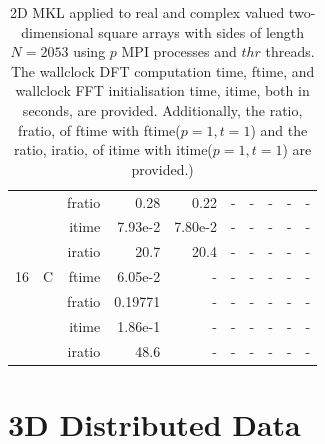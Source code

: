 \documentclass[a4paper]{article}
\begin{document}
\begin{table}[htbp]
\begin{center}
\begin{small}
\begin{tabular}{|r|r|r|r|r|r|r|r|r|r|}
             &             &  fratio &    0.28 &    0.22 &      - &      - &      - &      - &      - \\
             &             &  itime &    7.93e-2 &    7.80e-2 &      - &      - &      - &      - &      - \\
             &             &  iratio &    20.7 &   20.4 &     - &      - &      - &      - &      - \\\hline
   16 &   C &  ftime &    6.05e-2 &      - &      - &      - &      - &      - &      - \\
             &             &  fratio &    0.19771 &      - &      - &      - &      - &      - &      - \\
             &             &  itime &    1.86e-1 &      - &      - &      - &      - &      - &      - \\
             &             &  iratio &    48.6 &     - &      - &      - &      - &      - &      - \\\hline
\end{tabular}
\caption{2D MKL applied to real and complex valued two-dimensional square arrays with sides of length $N=2053$ using $p$ MPI processes and $thr$ threads. The wallclock DFT computation time, ftime, and wallclock FFT initialisation time, itime, both in seconds, are provided. Additionally, the ratio, fratio, of ftime  with ftime($p=1,t=1$) and the ratio, iratio, of itime  with itime($p=1,t=1$) are provided.) }\label{Tbl:MKL2d2053}
\end{small}
\end{center}
\end{table}


\clearpage

\section{3D Distributed Data}\label{App:3Ddist}
\end{document}
